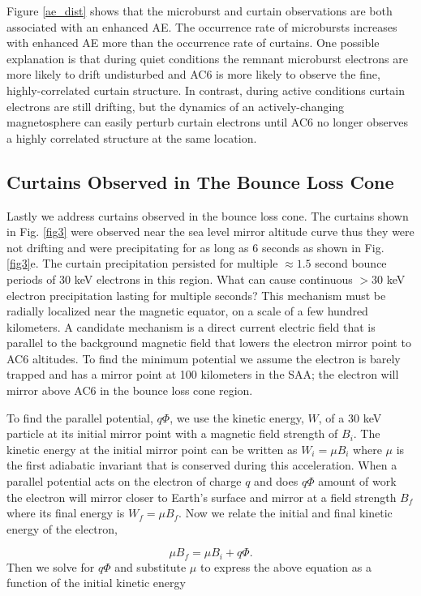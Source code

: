 \documentclass[draft]{agujournal2019}
\begin{document}
Figure \ref{ae_dist} shows that the microburst and curtain observations are both associated with an enhanced AE. The occurrence rate of microbursts increases with enhanced AE more than the occurrence rate of curtains. One possible explanation is that during quiet conditions the remnant microburst electrons are more likely to drift undisturbed and AC6 is more likely to observe the fine, highly-correlated curtain structure. In contrast, during active conditions curtain electrons are still drifting, but the dynamics of an actively-changing magnetosphere can easily perturb curtain electrons until AC6 no longer observes a highly correlated structure at the same location.
 
\subsection{Curtains Observed in The Bounce Loss Cone}
Lastly we address curtains observed in the bounce loss cone. The curtains shown in Fig. \ref{fig3} were observed near the sea level mirror altitude curve thus they were not drifting and were precipitating for as long as 6 seconds as shown in Fig. \ref{fig3}e. The curtain precipitation persisted for multiple $\approx 1.5$ second bounce periods of 30 keV electrons in this region. What can cause continuous $>30$ keV electron precipitation lasting for multiple seconds? This mechanism must be radially localized near the magnetic equator, on a scale of a few hundred kilometers. A candidate mechanism is a direct current electric field that is parallel to the background magnetic field that lowers the electron mirror point to AC6 altitudes. To find the minimum potential we assume the electron is barely trapped and has a mirror point at 100 kilometers in the SAA; the electron will mirror above AC6 in the bounce loss cone region. 

To find the parallel potential, $q \Phi$,  we use the kinetic energy, $W$, of a $30$ keV particle at its initial mirror point with a magnetic field strength of $B_i$. The kinetic energy at the initial mirror point can be written as $W_i = \mu B_i$ where $\mu$ is the first adiabatic invariant that is conserved during this acceleration. When a parallel potential acts on the electron of charge $q$ and does $q \Phi$ amount of work the electron will mirror closer to Earth's surface and mirror at a field strength $B_f$ where its final energy is $W_f = \mu B_f$. Now we relate the initial and final kinetic energy of the electron,

\begin{equation}
\mu B_f = \mu B_i + q \Phi.
\end{equation} Then we solve for $q \Phi$ and substitute $\mu$ to express the above equation as a function of the initial kinetic energy 
\end{document}
